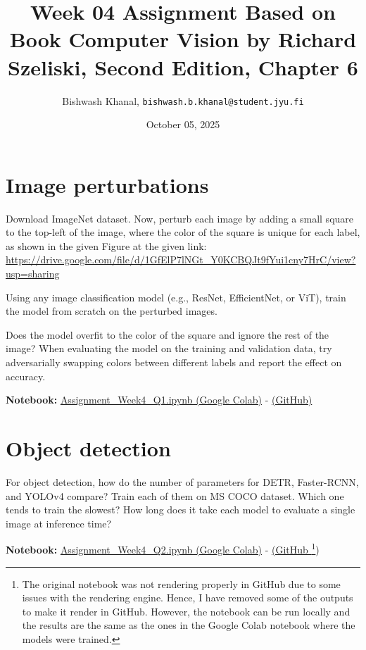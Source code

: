 \documentclass[12pt,a4paper]{article}
\title{Week 04 Assignment Based on Book Computer Vision by Richard Szeliski, Second Edition, Chapter 6}
\author{Bishwash Khanal, \texttt{bishwash.b.khanal@student.jyu.fi}}
\date{October 05, 2025}
\begin{document}
\maketitle

\section{Image perturbations}
Download ImageNet dataset. Now, perturb each image by adding a small square to the top-left of the image, where the color of the square is unique for 
each label, as shown in the given Figure at the given link: \url{https://drive.google.com/file/d/1GfElP7lNGt_Y0KCBQJt9fYui1cny7HrC/view?usp=sharing}


Using any image classification model (e.g., ResNet, EfficientNet, or ViT), train the model from scratch on the perturbed images.


Does the model overfit to the color of the square and ignore the rest of the image? When evaluating the model on the training and validation data, 
try adversarially swapping colors between different labels and report the effect on accuracy.

\textbf{Notebook:} \href{https://colab.research.google.com/drive/1own6DpmdM8Nlx5oqRM8h9s4naU_R6tED?usp=sharing}{Assignment\_Week4\_Q1.ipynb (Google Colab)} - 
\href{https://github.com/bkhanal-11/ties411_cvip_jyu/blob/master/assignment4/src/Assignment_Week4_Q1.ipynb}{(GitHub)}


\section{Object detection}
For object detection, how do the number of parameters for DETR, Faster-RCNN, and YOLOv4 compare? Train each of them on MS COCO dataset. 
Which one tends to train the slowest? How long does it take each model to evaluate a single image at inference time?

\textbf{Notebook:} \href{https://colab.research.google.com/drive/15lZexKpMhi8YTQSRUhzudx96gLgtdNkc?usp=sharing}{Assignment\_Week4\_Q2.ipynb (Google Colab)} - 
\href{https://github.com/bkhanal-11/ties411_cvip_jyu/blob/master/assignment4/src/Assignment_Week4_Q2.ipynb}{(GitHub \footnote{The original notebook was not rendering properly in GitHub due to some issues with the rendering engine.
Hence, I have removed some of the outputs to make it render in GitHub. However, the notebook can be run locally and the results are the same as the ones in the Google Colab notebook where the models were trained.})}
\end{document}
